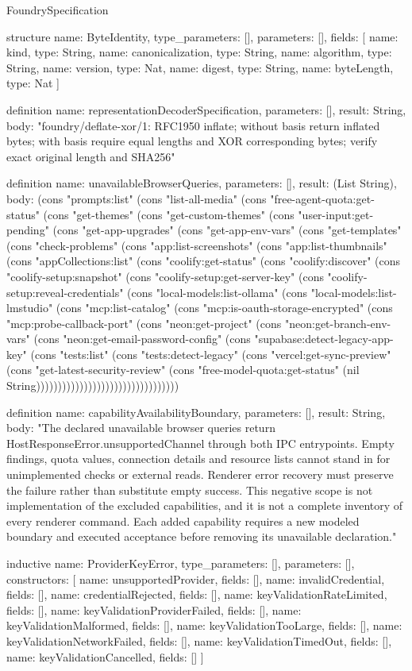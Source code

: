 \begin{lexlean}{FoundrySpecification}
\begin{semanticmodule}
structure{
  name: ByteIdentity,
  type_parameters: [],
  parameters: [],
  fields: [
    {name: kind, type: String},
    {name: canonicalization, type: String},
    {name: algorithm, type: String},
    {name: version, type: Nat},
    {name: digest, type: String},
    {name: byteLength, type: Nat}
  ]
}

definition{
  name: representationDecoderSpecification,
  parameters: [],
  result: String,
  body: "foundry/deflate-xor/1: RFC1950 inflate; without basis return inflated bytes; with basis require equal lengths and XOR corresponding bytes; verify exact original length and SHA256"
}

definition{
  name: unavailableBrowserQueries,
  parameters: [],
  result: (List String),
  body: (cons "prompts:list" (cons "list-all-media" (cons "free-agent-quota:get-status" (cons "get-themes" (cons "get-custom-themes" (cons "user-input:get-pending" (cons "get-app-upgrades" (cons "get-app-env-vars" (cons "get-templates" (cons "check-problems" (cons "app:list-screenshots" (cons "app:list-thumbnails" (cons "appCollections:list" (cons "coolify:get-status" (cons "coolify:discover" (cons "coolify-setup:snapshot" (cons "coolify-setup:get-server-key" (cons "coolify-setup:reveal-credentials" (cons "local-models:list-ollama" (cons "local-models:list-lmstudio" (cons "mcp:list-catalog" (cons "mcp:is-oauth-storage-encrypted" (cons "mcp:probe-callback-port" (cons "neon:get-project" (cons "neon:get-branch-env-vars" (cons "neon:get-email-password-config" (cons "supabase:detect-legacy-app-key" (cons "tests:list" (cons "tests:detect-legacy" (cons "vercel:get-sync-preview" (cons "get-latest-security-review" (cons "free-model-quota:get-status" (nil String)))))))))))))))))))))))))))))))))
}

definition{
  name: capabilityAvailabilityBoundary,
  parameters: [],
  result: String,
  body: "The declared unavailable browser queries return HostResponseError.unsupportedChannel through both IPC entrypoints. Empty findings, quota values, connection details and resource lists cannot stand in for unimplemented checks or external reads. Renderer error recovery must preserve the failure rather than substitute empty success. This negative scope is not implementation of the excluded capabilities, and it is not a complete inventory of every renderer command. Each added capability requires a new modeled boundary and executed acceptance before removing its unavailable declaration."
}

inductive{
  name: ProviderKeyError,
  type_parameters: [],
  parameters: [],
  constructors: [
    {name: unsupportedProvider, fields: []},
    {name: invalidCredential, fields: []},
    {name: credentialRejected, fields: []},
    {name: keyValidationRateLimited, fields: []},
    {name: keyValidationProviderFailed, fields: []},
    {name: keyValidationMalformed, fields: []},
    {name: keyValidationTooLarge, fields: []},
    {name: keyValidationNetworkFailed, fields: []},
    {name: keyValidationTimedOut, fields: []},
    {name: keyValidationCancelled, fields: []}
  ]
}


\end{semanticmodule}
\end{lexlean}
